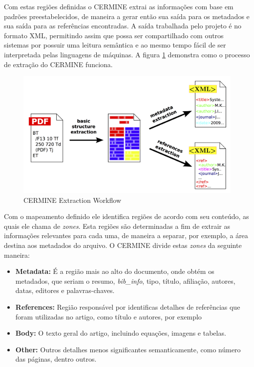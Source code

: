 Com estas regiões definidas o CERMINE extrai as informações com base em padrões preestabelecidos, de maneira a gerar então sua saída para os metadados e sua saída para as referências encontradas. A saída trabalhada pelo projeto é no formato XML, permitindo assim que possa ser compartilhado com outros sistemas por possuir uma leitura semântica e ao mesmo tempo fácil de ser interpretada pelas linguagens de máquinas. A figura \ref{fig:cermine-workflow} demonstra como o processo de extração do CERMINE funciona.

\begin{figure}
\centering
\caption{CERMINE Extraction Workflow}
\label{fig:cermine-workflow}
\includegraphics[width=0.7\linewidth]{./assets/cermine}
\end{figure}

Com o mapeamento definido ele identifica regiões de acordo com seu conteúdo, as quais ele chama de \textit{zones}. Esta regiões são determinadas a fim de extrair as informações relevantes para cada uma, de maneira a separar, por exemplo, a área destina aos metadados do arquivo. O CERMINE divide estas \textit{zones} da seguinte maneira:

\begin{itemize}
\item \textbf{Metadata:} É a região mais ao alto do documento, onde obtém os metadados, que seriam o resumo, \textit{bib\_info}, tipo, título, afiliação, autores, datas, editores e palavras-chaves.
\item \textbf{References:} Região responsável por identificas detalhes de referências que foram utilizadas no artigo, como título e autores, por exemplo
\item \textbf{Body:} O texto geral do artigo, incluindo equações, imagens e tabelas.
\item \textbf{Other:} Outros detalhes menos significantes semanticamente, como número das páginas, dentro outros.
\end{itemize}

